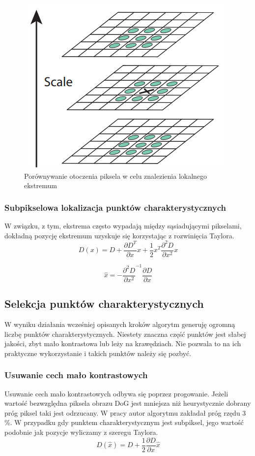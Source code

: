 \begin{figure}[!htb]
\centering
\includegraphics[scale=0.5]{pict/02/sift/sift_dgl_extremum.png}
\caption{Porównywanie otoczenia piksela w celu znalezienia lokalnego ekstremum}
\label{fig:sift_dgl_extremum}
\end{figure}
\subsubsection{Subpikselowa lokalizacja punktów charakterystycznych}
W związku, z tym, ekstrema często wypadają między sąsiadującymi pikselami, dokładną pozycję ekstremum uzyskuje się korzystając z rozwinięcia Taylora.
\begin{equation}
D(x) = D + \frac{\partial D^T}{\partial x}x + \frac{1}{2}x^T\frac{\partial^2D}{\partial x^2}x
\end{equation}

\begin{equation}
\widehat{x} = -\frac{\partial^2D}{\partial x^2}^{-1} \frac{\partial D}{\partial x}
\end{equation}




\subsection{Selekcja punktów charakterystycznych}
W wyniku działania wcześniej opisanych kroków algorytm generuję ogromną liczbę punktów charakterystycznych. Niestety znaczna część punktów jest słabej jakości, zbyt mało kontrastowa lub leży na krawędziach. Nie pozwala to na ich praktyczne wykorzystanie i takich punktów należy się pozbyć.
\subsubsection{Usuwanie cech mało kontrastowych}
Usuwanie cech mało kontrastowych odbywa się poprzez progowanie. Jeżeli wartość bezwzględna piksela obrazu DoG jest mniejsza niż heurystycznie dobrany próg piksel taki jest odrzucany. W pracy \cite{DGL04} autor algorytmu zakładał próg rzędu 3 \%. W przypadku gdy punktem charakterystycznym jest subpiksel, jego wartość podobnie jak pozycje wyliczamy z szeregu Taylora.
\begin{equation}
D(\widehat{x}) = D +   \frac{1}{2}\frac{\partial D}{\partial x}\widehat{x}
\end{equation}
